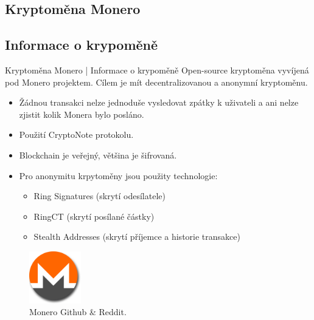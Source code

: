 \documentclass{beamer}
\begin{document}
  \begin{darkframes}
    \section{Kryptoměna Monero}
    \subsection{Informace o krypoměně}
    \begin{frame}{Kryptoměna Monero | Informace o krypoměně}
    Open-source kryptoměna vyvíjená pod Monero projektem.
    Cílem je mít decentralizovanou a anonymní kryptoměnu.
    
\begin{itemize}[<+->]
\item<1-4>  Žádnou transakci nelze jednoduše vysledovat zpátky k uživateli a ani nelze zjistit kolik Monera bylo posláno.
\item<2-4> Použití CryptoNote protokolu.
\item<3-4> Blockchain je veřejný, většina je šifrovaná.
\item<4-4> Pro anonymitu krpytoměny jsou použity technologie: 
\begin{itemize}
\item Ring Signatures (skrytí odesílatele)
\item RingCT (skrytí posílané částky)
\item Stealth Addresses (skrytí příjemce a historie transakce)
\end{itemize}
\end{itemize}    

     \begin{figure}
  \includegraphics[width=0.2\textwidth]{monero-icon.png}
  \caption{Monero Github \& Reddit.}  \label{fig:xray}
\end{figure}
    \end{frame}

\end{darkframes}
\end{document}
